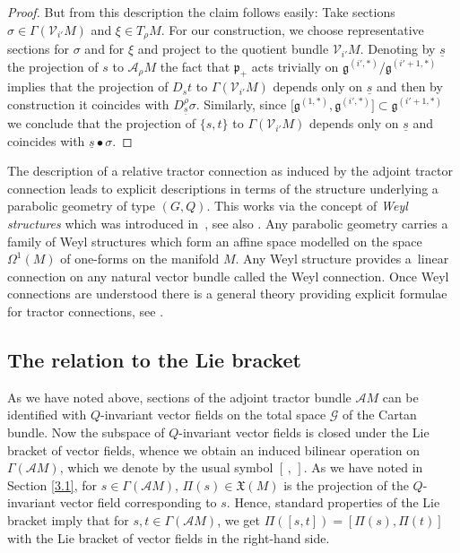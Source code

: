 \documentclass[pdftex]{sigma}
\numberwithin{equation}{section}
\def\frak{\mathfrak}
\def\Cal{\mathcal}
\newcommand{\si}{\sigma}
\newcommand{\Ga}{\Gamma}
\newcommand{\Om}{\Omega}
\begin{document}
\begin{proof}
But from this description the claim follows easily: Take sections $\si\in\Ga(\Cal
V_{i'}M)$ and $\xi\in T_\rho M$. For our construction, we choose representative
sections \smash{$t\in\Ga\bigl(\Cal A^{(i',*)}M\bigr)$} for $\si$ and \smash{$s\in\Ga\bigl(\Cal A^{(0,*)}M\bigr)$} for
$\xi$ and project \smash{$D_s t+\{s,t\}\in\Ga\bigl(\Cal A^{(i',*)}M\bigr)$} to the quotient bundle
$\Cal V_{i'}M$. Denoting by $\underline{s}$ the projection of $s$ to $\Cal A_\rho M$
the fact that $\frak p_+$ acts trivially on $\frak g^{(i',*)}/\frak g^{(i'+1,*)}$
implies that the projection of $D_s t$ to $\Ga(\Cal V_{i'}M)$ depends only on
$\underline{s}$ and then by construction it coincides with $D^\rho_{\underline
 s}\si$. Similarly, since $\bigl[\frak g^{(1,*)},\frak g^{(i',*)}\bigr]\subset\frak
g^{(i'+1,*)}$ we conclude that the projection of $\{s,t\}$ to $\Ga(\Cal V_{i'}M)$
depends only on $\underline{s}$ and coincides with $\underline{s}\bullet\si$.
\end{proof}

\begin{Remark}\label{rem3.1}
 The description of a relative tractor connection as induced by the adjoint tractor
 connection leads to explicit descriptions in terms of the structure underlying a
 parabolic geometry of type $(G,Q)$. This works via the concept of \textit{Weyl
 structures} which was introduced in~\cite{Weyl}, see also \cite[Section 5]{book}.
 Any parabolic geometry carries a family of Weyl structures which form
 an affine space modelled on the space $\Om^1(M)$ of one-forms on the manifold
 $M$. Any Weyl structure provides a~linear connection on any natural vector
 bundle called the Weyl connection. Once Weyl connections are understood there is a
 general theory providing explicit formulae for tractor connections, see \cite[Section 5.1]{book}.
\end{Remark}

\subsection{The relation to the Lie bracket}\label{3.2}
As we have noted above, sections of the adjoint tractor bundle $\Cal AM$ can be
identified with $Q$-invariant vector fields on the total space $\Cal G$ of the Cartan
bundle. Now the subspace of $Q$-invariant vector fields is closed under the Lie
bracket of vector fields, whence we obtain an induced bilinear operation on $\Ga(\Cal
AM)$, which we denote by the usual symbol $[\, ,\, ]$. As we have noted in Section
\ref{3.1}, for $s\in\Ga(\Cal AM)$, $\Pi(s)\in\frak X(M)$ is the projection of the
$Q$-invariant vector field corresponding to $s$. Hence, standard properties of the Lie
bracket imply that for $s,t\in\Ga(\Cal AM)$, we get $\Pi([s,t])=[\Pi(s),\Pi(t)]$ with
the Lie bracket of vector fields in the right-hand side.
\end{document}

